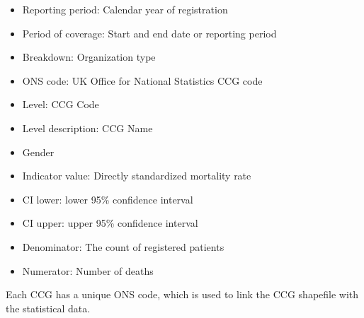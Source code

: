 \begin{itemize}
    \item Reporting period: Calendar year of registration
    \item Period of coverage: Start and end date or reporting period
    \item Breakdown: Organization type
    \item ONS code: UK Office for National Statistics CCG code
    \item Level: CCG Code
    \item Level description: CCG Name
    \item Gender
    \item Indicator value: Directly standardized mortality rate
    \item CI lower: lower 95\% confidence interval
    \item CI upper: upper 95\% confidence interval
    \item Denominator: The count of registered patients
    \item Numerator: Number of deaths
\end{itemize}

Each CCG has a unique ONS code, which is used to link the CCG shapefile with the statistical data.